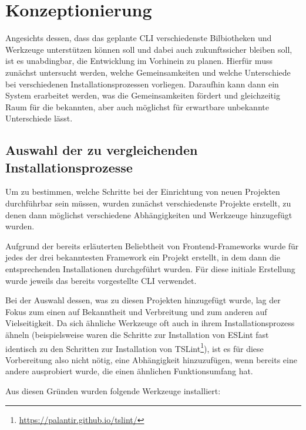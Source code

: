 \section{Konzeptionierung}
\label{komzeptionierung}
Angesichts dessen, dass das geplante \gls{CLI} verschiedenste Bilbiotheken und Werkzeuge unterstützen können soll und dabei auch zukunftssicher bleiben soll, ist es unabdingbar, die Entwicklung im Vorhinein zu planen. Hierfür muss zunächst untersucht werden, welche Gemeinsamkeiten und welche Unterschiede bei verschiedenen Installationsprozessen vorliegen. Daraufhin kann dann ein System erarbeitet werden, was die Gemeinsamkeiten fördert und gleichzeitig Raum für die bekannten, aber auch möglichst für erwartbare unbekannte Unterschiede lässt.

\subsection{Auswahl der zu vergleichenden Installationsprozesse}
Um zu bestimmen, welche Schritte bei der Einrichtung von neuen Projekten durchführbar sein müssen, wurden zunächst verschiedenste Projekte erstellt, zu denen dann möglichst verschiedene Abhängigkeiten und Werkzeuge hinzugefügt wurden.

Aufgrund der bereits erläuterten Beliebtheit von Frontend-Frameworks wurde für jedes der drei bekanntesten Framework ein Projekt erstellt, in dem dann die entsprechenden Installationen durchgeführt wurden. Für diese initiale Erstellung wurde jeweils das bereits vorgestellte \gls{CLI} verwendet.

Bei der Auswahl dessen, was zu diesen Projekten hinzugefügt wurde, lag der Fokus zum einen auf Bekanntheit und Verbreitung und zum anderen auf Vielseitigkeit. Da sich ähnliche Werkzeuge oft auch in ihrem Installationsprozess ähneln (beispielsweise waren die Schritte zur Installation von ESLint fast identisch zu den Schritten zur Installation von TSLint\footnote{\url{https://palantir.github.io/tslint/}}), ist es für diese Vorbereitung also nicht nötig, eine Abhängigkeit hinzuzufügen, wenn bereits eine andere ausprobiert wurde, die einen ähnlichen Funktionsumfang hat.

Aus diesen Gründen wurden folgende Werkzeuge installiert:

